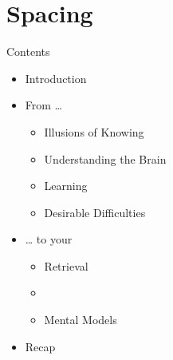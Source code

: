 \documentclass{ercisbeamer}
\begin{document}
\section{Spacing}
\begin{frame}{Contents}
    \begin{itemize}
        \item Introduction
        \item From …
        \begin{itemize}
            \item Illusions of Knowing
            \item Understanding the Brain
            \item Learning
            \item Desirable Difficulties
        \end{itemize}
        \item … to your 
        \begin{itemize}
            \item Retrieval
            \item {}
            \item Mental Models
        \end{itemize}
        \item Recap
    \end{itemize}
\end{frame}
\end{document}
